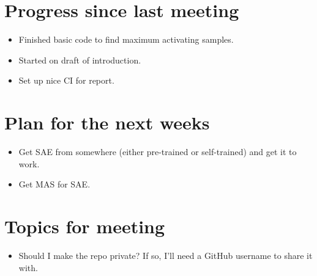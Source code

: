 \documentclass[main.tex]{subfiles}
\begin{document}
\section*{Progress since last meeting}
\begin{itemize}
    \item Finished basic code to find maximum activating samples.
    \item Started on draft of introduction.
    \item Set up nice CI for report.
\end{itemize}
\section*{Plan for the next weeks}
\begin{itemize}
    \item Get SAE from somewhere (either pre-trained or self-trained) and get it to work.
    \item Get MAS for SAE.
\end{itemize}
\section*{Topics for meeting}
\begin{itemize}
    \item Should I make the repo private? If so, I'll need a GitHub username to share it with.
\end{itemize}
\end{document}
